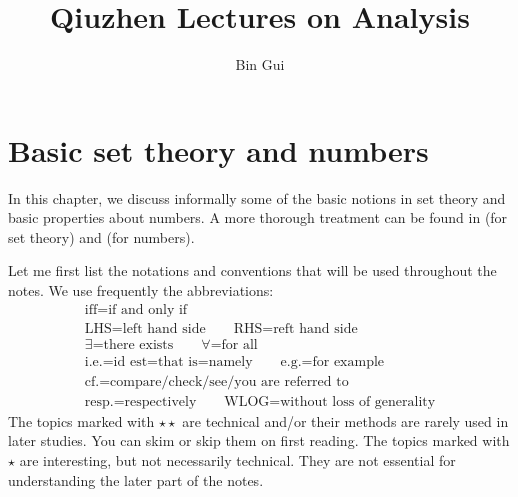 \documentclass[12pt,b5paper,notitlepage]{article}
\title{Qiuzhen Lectures on Analysis}
\author{{\sc Bin Gui}
}
\theoremstyle{definition}
\theoremstyle{plain}
\numberwithin{equation}{section}
\begin{document}
\sloppy %
	\setcounter{page}{1}
	






	
	\maketitle



\makeatletter
\newcommand*{\toccontents}{}
\makeatother
\toccontents



	


\newpage

\section{Basic set theory and numbers}


In this chapter, we discuss informally some of the basic notions in set theory and basic properties about numbers. A more thorough treatment can be found in \cite[Ch. 1]{Mun} (for set theory) and \cite[Ch. 1]{Rud-P} (for numbers). 

Let me first list the notations and conventions that will be used throughout the notes. We use frequently the abbreviations:
\begin{gather*}
\text{iff=if and only if}\\
\text{LHS=left hand side}\qquad
\text{RHS=reft hand side}\\
\text{$\exists$=there exists}\qquad \text{$\forall$=for all}\\
\text{i.e.=id est=that is=namely}\qquad\text{e.g.=for example}\\
\text{cf.=compare/check/see/you are referred to}\\
\text{resp.=respectively}\qquad 
\text{WLOG=without loss of generality}
\end{gather*}
The topics marked with $\star\star$ are technical and/or their methods are rarely used in later studies. You can skim or skip them on first reading. The topics marked with $\star$ are interesting, but not necessarily technical. They are not essential for understanding the later part of the notes.
\end{document}

